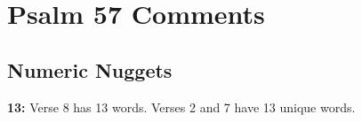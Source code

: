 \section{Psalm 57 Comments}

\subsection{Numeric Nuggets}
\textbf{13: } Verse 8 has 13 words. Verses 2 and 7 have 13 unique words.

